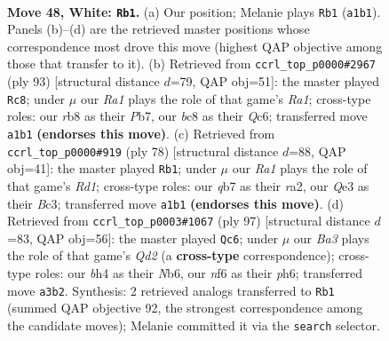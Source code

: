 \documentclass[11pt]{article}
\begin{document}
\clearpage

\begin{figure}[p]\centering
\begin{subfigure}{0.46\textwidth}\centering
\resizebox{\linewidth}{!}{%
\newchessgame
\chessboard[
  setfen={1rb3k1/pqp2pp1/1p3n2/7p/1P3P1b/B3Q2P/P1B3P1/R6K w - - 3 48},
  showmover=false,
  pgfstyle=straightmove, color=movearrow, markmove={a1-b1}
]}
\caption{}
\end{subfigure}\hfill
\begin{subfigure}{0.46\textwidth}\centering
\resizebox{\linewidth}{!}{%
\newchessgame
\chessboard[
  setfen={r5k1/1p4p1/2qb1pb1/7p/p2B1P2/P1P1R1NP/1P3QP1/6K1 b - - 3 47},
  showmover=false,
  pgfstyle=straightmove, color=movearrow, markmove={a8-c8}
]}
\caption{}
\end{subfigure}
\\[4pt]
\begin{subfigure}{0.46\textwidth}\centering
\resizebox{\linewidth}{!}{%
\newchessgame
\chessboard[
  setfen={q4nk1/6pb/3bpp1p/1Q1p4/6P1/2BP1N1P/r3PP2/3R1BK1 w - - 0 40},
  showmover=false,
  pgfstyle=straightmove, color=movearrow, markmove={d1-b1}
]}
\caption{}
\end{subfigure}\hfill
\begin{subfigure}{0.46\textwidth}\centering
\resizebox{\linewidth}{!}{%
\newchessgame
\chessboard[
  setfen={4r1k1/3qb2p/1n4pP/1p1pB3/3P4/p1P3Q1/2P2PB1/1R4K1 b - - 7 49},
  showmover=false,
  pgfstyle=straightmove, color=movearrow, markmove={d7-c6}
]}
\caption{}
\end{subfigure}
\caption{\textbf{Move 48, White: \texttt{Rb1}.} (a) Our position; Melanie plays \texttt{Rb1} (\texttt{a1b1}). Panels (b)--(d) are the retrieved master positions whose correspondence most drove this move (highest QAP objective among those that transfer to it). (b) Retrieved from \texttt{ccrl\_top\_p0000\#2967} (ply 93) [structural distance $d$=79, QAP obj=51]: the master played \texttt{Rc8}; under $\mu$ our \emph{Ra1} plays the role of that game's \emph{Ra1}; cross-type roles: our \emph{r}b8 as their \emph{P}b7, our \emph{b}c8 as their \emph{Q}c6; transferred move \texttt{a1b1} \textbf{(endorses this move)}. (c) Retrieved from \texttt{ccrl\_top\_p0000\#919} (ply 78) [structural distance $d$=88, QAP obj=41]: the master played \texttt{Rb1}; under $\mu$ our \emph{Ra1} plays the role of that game's \emph{Rd1}; cross-type roles: our \emph{q}b7 as their \emph{r}a2, our \emph{Q}e3 as their \emph{B}c3; transferred move \texttt{a1b1} \textbf{(endorses this move)}. (d) Retrieved from \texttt{ccrl\_top\_p0003\#1067} (ply 97) [structural distance $d$=83, QAP obj=56]: the master played \texttt{Qc6}; under $\mu$ our \emph{Ba3} plays the role of that game's \emph{Qd2} (a \textbf{cross-type} correspondence); cross-type roles: our \emph{b}h4 as their \emph{N}b6, our \emph{n}f6 as their \emph{p}h6; transferred move \texttt{a3b2}. Synthesis: 2 retrieved analogs transferred to \texttt{Rb1} (summed QAP objective 92, the strongest correspondence among the candidate moves); Melanie committed it via the \texttt{search} selector.}
\label{fig:thought-m94}
\end{figure}
\end{document}
